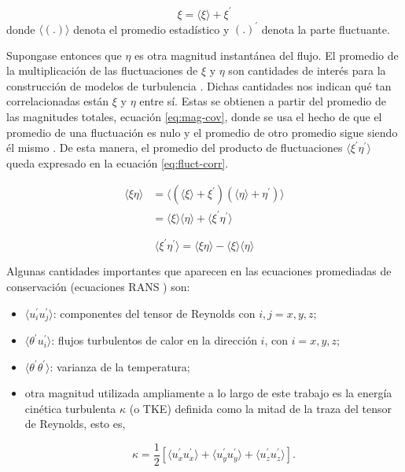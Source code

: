 $$\xi = \langle \xi \rangle + \xi^{\prime}$$
donde $\langle (\text{.}) \rangle$ denota el promedio estadístico y $(\text{.})^{\prime}$ denota la parte fluctuante. 

Supongase entonces que $\eta$ es otra magnitud instantánea del flujo. El promedio de la multiplicación  de las fluctuaciones de $\xi$ y $\eta$ son cantidades de interés para la construcción de modelos de turbulencia \cite{pope2001turbulent}. Dichas cantidades nos indican qué tan correlacionadas están $\xi$ y $\eta$ entre sí. Estas se obtienen a partir del promedio de las magnitudes totales, ecuación \ref{eq:mag-cov}, donde se usa el hecho de que el promedio de una fluctuación es nulo y el promedio de otro promedio sigue siendo él mismo \cite{pope2001turbulent}. De esta manera, el promedio del producto de fluctuaciones $\langle \xi^{\prime} \eta^{\prime} \rangle$ queda expresado en la ecuación \ref{eq:fluct-corr}.

\begin{equation}
\begin{aligned}
\langle \xi \eta \rangle &= \langle (\langle \xi \rangle + \xi^{\prime}) (\langle \eta \rangle + \eta^{\prime}) \rangle \\
                         &= \langle \xi \rangle \langle \eta \rangle + \langle \xi^{\prime} \eta^{\prime} \rangle
\end{aligned}
\label{eq:mag-cov}
\end{equation}

\begin{equation}
\langle \xi^{\prime} \eta^{\prime} \rangle = \langle \xi \eta \rangle - \langle \xi \rangle \langle \eta \rangle
\label{eq:fluct-corr}
\end{equation}

Algunas cantidades importantes que aparecen en las ecuaciones promediadas de conservación (ecuaciones RANS \cite{kundu}) son:

\begin{itemize}
	\item $\langle u^{\prime}_i u^{\prime}_j \rangle$: componentes del tensor de Reynolds con $i,j=x,y,z$;
	\item $\langle \theta^{\prime} u^{\prime}_i \rangle$: flujos turbulentos de calor en la dirección $i$, con $i=x,y,z$;
	\item $\langle \theta^{\prime} \theta^{\prime} \rangle$: varianza de la temperatura;

	\item otra magnitud utilizada ampliamente a lo largo de este trabajo es la energía cinética turbulenta $\kappa$ (o TKE) definida como la mitad de la traza del tensor de Reynolds, esto es, 

\begin{equation}
\kappa = \frac{1}{2} \left[ \langle u^{\prime}_x u^{\prime}_x \rangle + \langle u^{\prime}_y u^{\prime}_y \rangle + \langle u^{\prime}_z u^{\prime}_z \rangle \right] \text{.}
\label{eq:tke}
\end{equation}

\end{itemize}


